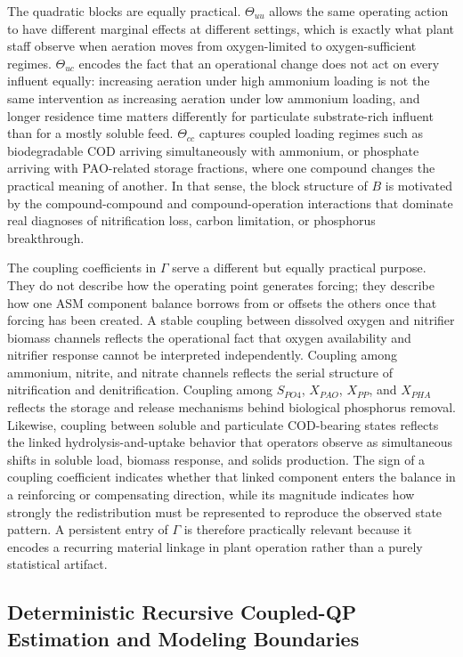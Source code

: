 \documentclass[11pt]{article}
\begin{document}
The quadratic blocks are equally practical. $\Theta_{uu}$ allows the same operating action to have different marginal effects at different settings, which is exactly what plant staff observe when aeration moves from oxygen-limited to oxygen-sufficient regimes. $\Theta_{uc}$ encodes the fact that an operational change does not act on every influent equally: increasing aeration under high ammonium loading is not the same intervention as increasing aeration under low ammonium loading, and longer residence time matters differently for particulate substrate-rich influent than for a mostly soluble feed. $\Theta_{cc}$ captures coupled loading regimes such as biodegradable COD arriving simultaneously with ammonium, or phosphate arriving with PAO-related storage fractions, where one compound changes the practical meaning of another. In that sense, the block structure of $B$ is motivated by the compound-compound and compound-operation interactions that dominate real diagnoses of nitrification loss, carbon limitation, or phosphorus breakthrough.

The coupling coefficients in $\Gamma$ serve a different but equally practical purpose. They do not describe how the operating point generates forcing; they describe how one ASM component balance borrows from or offsets the others once that forcing has been created. A stable coupling between dissolved oxygen and nitrifier biomass channels reflects the operational fact that oxygen availability and nitrifier response cannot be interpreted independently. Coupling among ammonium, nitrite, and nitrate channels reflects the serial structure of nitrification and denitrification. Coupling among $S_{PO4}$, $X_{PAO}$, $X_{PP}$, and $X_{PHA}$ reflects the storage and release mechanisms behind biological phosphorus removal. Likewise, coupling between soluble and particulate COD-bearing states reflects the linked hydrolysis-and-uptake behavior that operators observe as simultaneous shifts in soluble load, biomass response, and solids production. The sign of a coupling coefficient indicates whether that linked component enters the balance in a reinforcing or compensating direction, while its magnitude indicates how strongly the redistribution must be represented to reproduce the observed state pattern. A persistent entry of $\Gamma$ is therefore practically relevant because it encodes a recurring material linkage in plant operation rather than a purely statistical artifact.

\subsection{Deterministic Recursive Coupled-QP Estimation and Modeling Boundaries}
\end{document}
